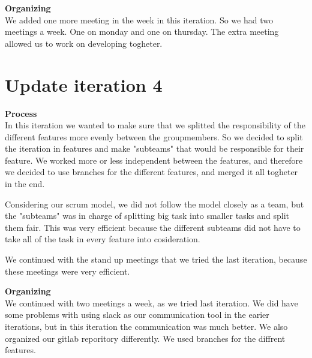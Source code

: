 \documentclass[norsk]{article}
\begin{document}
\textbf{Organizing}\\
We added one more meeting in the week in this iteration. So we had two meetings a week. One on monday and one on thursday. The extra meeting allowed us to work on developing togheter.

\section{Update iteration 4}
\textbf{Process}\\
In this iteration we wanted to make sure that we splitted the responsibility of the different features more evenly between the groupmembers. So we decided to split the iteration in features and make "subteams" that would be responsible for their feature. We worked more or less independent between the features, and therefore we decided to use branches for the different features, and merged it all togheter in the end.

Considering our scrum model, we did not follow the model closely as a team, but the "subteams" was in charge of splitting big task into smaller tasks and split them fair. This was very efficient because the different subteams did not have to take all of the task in every feature into cosideration.

We continued with the stand up meetings that we tried the last iteration, because these meetings were very efficient.  

\textbf{Organizing}\\
We continued with two meetings a week, as we tried last iteration.
We did have some problems with using slack as our communication tool in the earier iterations, but in this iteration the communication was much better. We also organized our gitlab reporitory differently. We used branches for the diffrent features.
\end{document}
